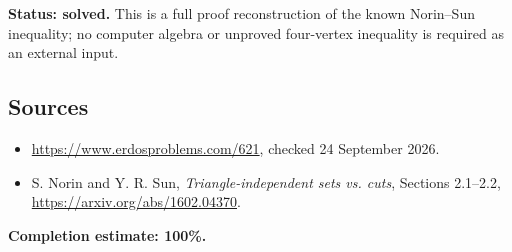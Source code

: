 \textbf{Status: solved.} This is a full proof reconstruction of the known Norin--Sun inequality; no computer algebra or unproved four-vertex inequality is required as an external input.

\subsection*{Sources}
\begin{itemize}
\item \url{https://www.erdosproblems.com/621}, checked 24 September 2026.
\item S. Norin and Y. R. Sun, \emph{Triangle-independent sets vs. cuts}, Sections 2.1--2.2, \url{https://arxiv.org/abs/1602.04370}.
\end{itemize}
\noindent\textbf{Completion estimate: 100\%.}

